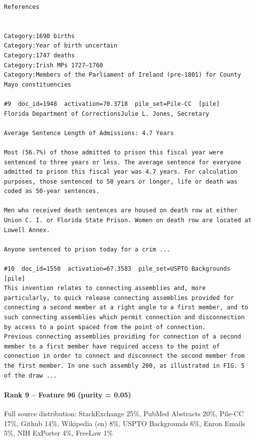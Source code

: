 \begin{verbatim}
References 
 

Category:1690 births
Category:Year of birth uncertain
Category:1747 deaths
Category:Irish MPs 1727–1760
Category:Members of the Parliament of Ireland (pre-1801) for County Mayo constituencies

#9  doc_id=1948  activation=70.3718  pile_set=Pile-CC  [pile]
Florida Department of CorrectionsJulie L. Jones, Secretary

Average Sentence Length of Admissions: 4.7 Years

Most (56.7%) of those admitted to prison this fiscal year were sentenced to three years or less. The average sentence for everyone admitted to prison this fiscal year was 4.7 years. For calculation purposes, those sentenced to 50 years or longer, life or death was coded as 50-year sentences.

Men who received death sentences are housed on death row at either Union C. I. or Florida State Prison. Women on death row are located at Lowell Annex.

Anyone sentenced to prison today for a crim ...

#10  doc_id=1550  activation=67.3583  pile_set=USPTO Backgrounds  [pile]
This invention relates to connecting assemblies and, more particularly, to quick release connecting assemblies provided for connecting a second member at a right angle to a first member, and to such connecting assemblies which permit connection and disconnection by access to a point spaced from the point of connection.
Previous connecting assemblies providing for connection of a second member to a first member have required access to the point of connection in order to connect and disconnect the second member from the first member. In one such assembly 200, as illustrated in FIG. 5 of the draw ...

\end{verbatim}

\paragraph*{Rank 9 -- Feature 96 (purity = 0.05)}

Full source distribution: StackExchange 25\%, PubMed Abstracts 20\%, Pile-CC 17\%, Github 14\%, Wikipedia (en) 8\%, USPTO Backgrounds 6\%, Enron Emails 5\%, NIH ExPorter 4\%, FreeLaw 1\%

